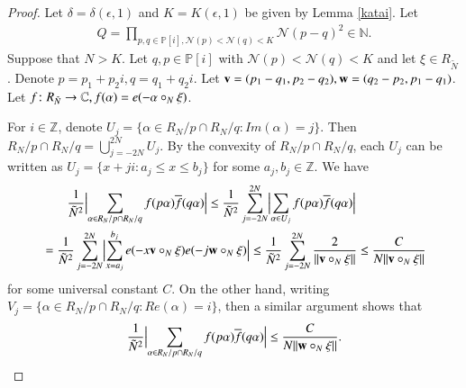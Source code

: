 \documentclass[12pt,amstex]{amsart}
\theoremstyle{definition}
\def \P {\mathbb{P}[i]}
\def \A {\alpha}
\def \e {\epsilon}
\def \R {R_{\tilde{N}}}
\def \v {\bold{v}}
\def \w {\bold{w}}
\def \x {\bold{\xi}}
\begin{document}
\begin{proof}
  Let $\delta=\delta(\e,1)$ and $K=K(\e,1)$ be given by Lemma \ref{katai}. Let
    \begin{equation}\nonumber
  \begin{split}
   Q=\prod_{p,q\in\P,\mathcal{N}(p)<\mathcal{N}(q)<K}\mathcal{N}(p-q)^{2}\in\mathbb{N}.
  \end{split}
\end{equation}
Suppose that $N>K$. Let $q,p\in\P$ with $\mathcal{N}(p)<\mathcal{N}(q)<K$ and let $\xi\in \R$. Denote $p=p_{1}+p_{2}i,q=q_{1}+q_{2}i$. Let $\v=(p_{1}-q_{1},p_{2}-q_{2}), \w=(q_{2}-p_{2},p_{1}-q_{1})$. Let $f\colon\R\rightarrow\mathbb{C}, f(\A)=e(-\A\circ_{N}\x)$.

  For $i\in\mathbb{Z}$, denote $U_{j}=\{\A\in R_{N}/p\cap R_{N}/q\colon Im(\A)=j\}$. Then $ R_{N}/p\cap R_{N}/q=\bigcup_{j=-2N}^{2N}U_{j}$. By the convexity of $ R_{N}/p\cap R_{N}/q$, each $U_{j}$ can be written as $U_{j}=\{x+ji\colon a_{j}\leq x\leq b_{j}\}$ for some $a_{j}, b_{j}\in\mathbb{Z}$. We have
  \begin{equation}\nonumber
  \begin{split}
   &\qquad\frac{1}{\tilde{N}^{2}}\Bigl\vert\sum_{\A\in R_{N}/p\cap R_{N}/q}f(p\A)\overline{f}(q\A)\Bigr\vert
   \leq\frac{1}{{\tilde{N}^{2}}}\sum_{j=-2N}^{2N}\Bigl\vert\sum_{\A\in U_{j}}f(p\A)\overline{f}(q\A)\Bigr\vert
   \\&=\frac{1}{{\tilde{N}^{2}}}\sum_{j=-2N}^{2N}\Bigl\vert\sum_{x=a_{j}}^{b_{j}}e(-x\v\circ_{N}\x)e(-j\w\circ_{N}\x) \Bigr\vert
   \leq\frac{1}{{\tilde{N}^{2}}}\sum_{j=-2N}^{2N}
   \frac{2}{\Vert \v\circ_{N}\x\Vert}\leq\frac{C}{N\Vert\v\circ_{N}\x\Vert}
  \end{split}
\end{equation}
for some universal constant $C$.
On the other hand, writing $V_{j}=\{\A\in R_{N}/p\cap R_{N}/q\colon Re(\A)=i\}$, then a similar argument shows that 
$$\frac{1}{\tilde{N}^{2}}\Bigl\vert\sum_{\A\in R_{N}/p\cap R_{N}/q}f(p\A)\overline{f}(q\A)\Bigr\vert\leq\frac{C}{N\Vert\w\circ_{N}\x\Vert}.$$


\end{proof}
\end{document}
